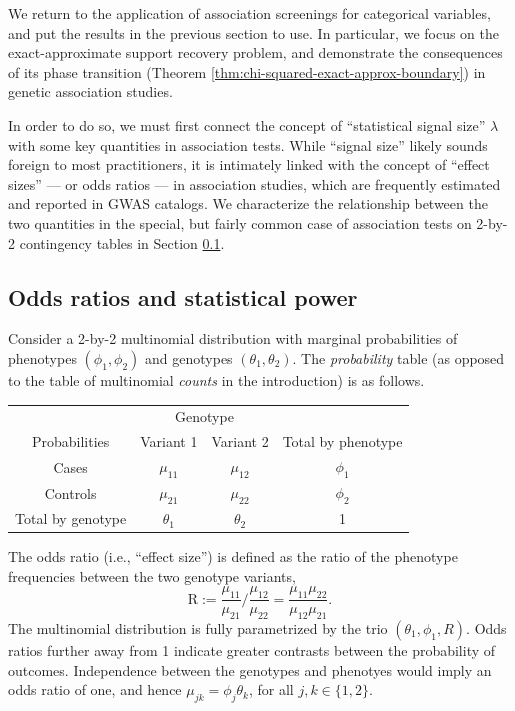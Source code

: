 

We return to the application of association screenings for categorical variables, and put the results in the previous section to use.
In particular, we focus on the exact-approximate support recovery problem, and demonstrate the consequences of its phase transition (Theorem \ref{thm:chi-squared-exact-approx-boundary}) in genetic association studies.

In order to do so, we must first connect the concept of ``statistical signal size'' $\lambda$ with some key quantities in association tests.
While ``signal size'' likely sounds foreign to most practitioners, it is intimately linked with the concept of ``effect sizes'' --- or odds ratios --- in association studies, which are frequently estimated and reported in GWAS catalogs.
We characterize the relationship between the two quantities in the special, but fairly common case of association tests on 2-by-2 contingency tables in Section \ref{subsec:odds-and-power}.


\subsection{Odds ratios and statistical power}
\label{subsec:odds-and-power}


Consider a 2-by-2 multinomial distribution with marginal probabilities of phenotypes $(\phi_1, \phi_2)$ and genotypes $(\theta_1, \theta_2)$.
The \emph{probability} table (as opposed to the table of multinomial \emph{counts} in the introduction) is as follows.
\begin{center}
    \begin{tabular}{cccc}
    \hline
    & \multicolumn{2}{c}{Genotype} \\
    \cline{2-3}
    Probabilities & Variant 1 & Variant 2 & Total by phenotype \\
    \hline
    Cases & $\mu_{11}$ & $\mu_{12}$ & $\phi_1$ \\
    Controls & $\mu_{21}$ & $\mu_{22}$ & $\phi_2$ \\
    Total by genotype & $\theta_1$ & $\theta_2$ & 1 \\
    \hline
    \end{tabular}
\end{center}
The odds ratio (i.e., ``effect size'') is defined as the ratio of the phenotype frequencies between the two genotype variants,
\begin{equation} \label{eq:odds-ratio}
    \text{R} := \frac{\mu_{11}}{\mu_{21}}\Big/\frac{\mu_{12}}{\mu_{22}}
    = \frac{\mu_{11}\mu_{22}}{\mu_{12}\mu_{21}}.
\end{equation}
The multinomial distribution is fully parametrized by the trio $(\theta_1, \phi_1, R)$.
Odds ratios further away from 1 indicate greater contrasts between the probability of outcomes.
Independence between the genotypes and phenotyes would imply an odds ratio of one, and hence $\mu_{jk} = \phi_j\theta_k$, for all $j,k \in\{1,2\}$.

